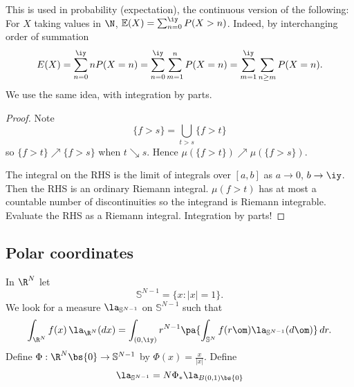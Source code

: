 This is used in probability (expectation), the continuous version of the following: For $X$ taking values in $\N$, $\mathbb E(X)=\sum_{n=0}^{\iy} P(X>n)$. 
Indeed, by interchanging order of summation 
\[E(X)=\sum_{n=0}^{\iy} nP(X=n)=\sum_{n=0}^{\iy}\sum_{m=1}^nP(X=n)=\sum_{m=1}^{\iy} \sum_{n\ge m} P(X=n).\]
We use the same idea, with integration by parts.
\begin{proof}
Note
\[
\{f>s\}=\bigcup_{t>s} \{f>t\}
\]
so $\{f>t\}\nearrow \{f>s\}$ when $t\searrow s$. Hence $\mu(\{f>t\})\nearrow \mu(\{f>s\})$.

The integral on the RHS is the limit of integrals over $[a,b]$ as $a\to 0$, $b\to \iy$. Then the RHS is an ordinary Riemann integral. $\mu(f>t)$ has at most a countable number of discontinuities so the integrand is Riemann integrable. Evaluate the RHS as a Riemann integral. Integration by parts!
\end{proof}
\subsection{Polar coordinates}
In $\R^N$ let
\[
\mathbb S^{N-1}=\{x:|x|=1\}.
\]
We look for a measure $\la_{\mathbb S^{N-1}}$ on $\mathbb S^{N-1}$ such that
\[
\int_{\R^N} f(x)\,\la_{\R^N}(dx)=
\int_{(0,\iy)} r^{N-1}\pa{
\int_{\mathbb S^N} f(r\om)\la_{\mathbb S^{N-1}}(d\om)
}\,dr.
\]
Define $\Phi:\R^N\bs\{0\}\to \mathbb S^{N-1}$ by $\Phi(x)=\frac{x}{|x|}$. Define
\[
\la_{\mathbb S^{N-1}}=N\Phi_*\la_{B(0,1)\bs\{0\}}
\]
